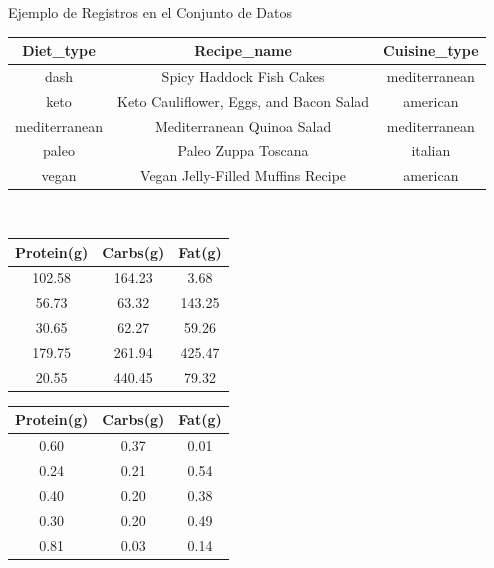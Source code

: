 \documentclass{beamer}
\begin{document}
    \begin{frame}{Ejemplo de Registros en el Conjunto de Datos}
        \begin{center}
        \begin{tabular}{|c|c|c|}
            \hline
            \textbf{Diet\_type} & Recipe\_name & \textbf{Cuisine\_type} \\
            \hline
            \small{dash} & \small{Spicy Haddock Fish Cakes} & \small{mediterranean} \\
            \small{keto} & \small{Keto Cauliflower, Eggs, and Bacon Salad} & \small{american} \\
            \small{mediterranean} & \small{Mediterranean Quinoa Salad} & \small{mediterranean} \\
            \small{paleo} & \small{Paleo Zuppa Toscana} & \small{italian} \\
            \small{vegan} & \small{Vegan Jelly-Filled Muffins Recipe} & \small{american} \\
            \hline
        \end{tabular}\\
        \vspace{0.5cm}
        \begin{tabular}{|c|c|c|}
            \hline
            \textbf{Protein(g)} & \textbf{Carbs(g)} & \textbf{Fat(g)} \\
            \hline
            \small{102.58} & \small{164.23} & \small{3.68} \\
            \small{56.73} & \small{63.32} & \small{143.25} \\
            \small{30.65} & \small{62.27} & \small{59.26} \\
            \small{179.75} & \small{261.94} & \small{425.47} \\
            \small{20.55} & \small{440.45} & \small{79.32} \\
            \hline
        \end{tabular}
        \begin{tabular}{|c|c|c|}
            \hline
            \textbf{Protein(g)} & \textbf{Carbs(g)} & \textbf{Fat(g)} \\
            \hline
            \small{0.60} & \small{0.37} & \small{0.01} \\
            \small{0.24} & \small{0.21} & \small{0.54} \\
            \small{0.40} & \small{0.20} & \small{0.38} \\
            \small{0.30} & \small{0.20} & \small{0.49} \\
            \small{0.81} & \small{0.03} & \small{0.14} \\
            \hline
        \end{tabular}
        \end{center}
    \end{frame}
    
\end{document}
